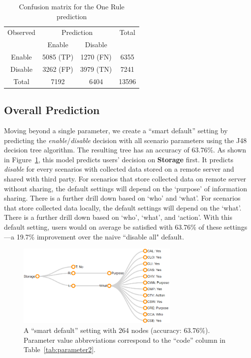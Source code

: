 \begin{table}
	\centering
	\caption{Confusion matrix for the One Rule prediction}
	\label{tab:oner_confusion_matrix}
	\begin{tabular}{c|c|c|c} \hline
		Observed &\multicolumn{2}{c|}{Prediction} & Total\\ \cline{2-3}
		& Enable     & Disable       &  \\ \hline
		Enable   & 5085 (TP) & 1270 (FN)  & 6355   \\ \hline
		Disable    & 3262 (FP)  & 3979 (TN) & 7241  \\ \hline
		Total & 7192     & 6404     & 13596  \\ \hline
	\end{tabular}
\end{table}

\subsection{Overall Prediction}
Moving beyond a single parameter, we create a ``smart default'' setting by predicting the \textit{enable}/\textit{disable} decision with all scenario parameters using the J48 decision tree algorithm.
The resulting tree has an accuracy of 63.76\%. As shown in Figure~\ref{fig:smart_default}, this model predicts users' decision on \textbf{Storage} first. It predicts \textit{disable} for every scenarios with collected data stored on a remote server and shared with third party. For scenarios that store collected data on remote server without sharing, the default settings will depend on the `purpose' of information sharing. There is a further drill down based on `who' and `what'. For scenarios that store collected data locally, the default settings will depend on the `what'. There is a further drill down based on `who', `what', and `action'. With this default setting, users would on average be satisfied with 63.76\% of these settings---a 19.7\% improvement over the naive ``disable all" default. 

\begin{figure}
	\centering
	\includegraphics[width=0.7\textwidth]{figures/smartdefault025.png}
	\caption{A ``smart default'' setting with 264 nodes (accuracy: 63.76\%). Parameter value abbreviations correspond to the ``code'' column in Table~\ref{tab:parameter2}.}
	\label{fig:smart_default}
\end{figure}


